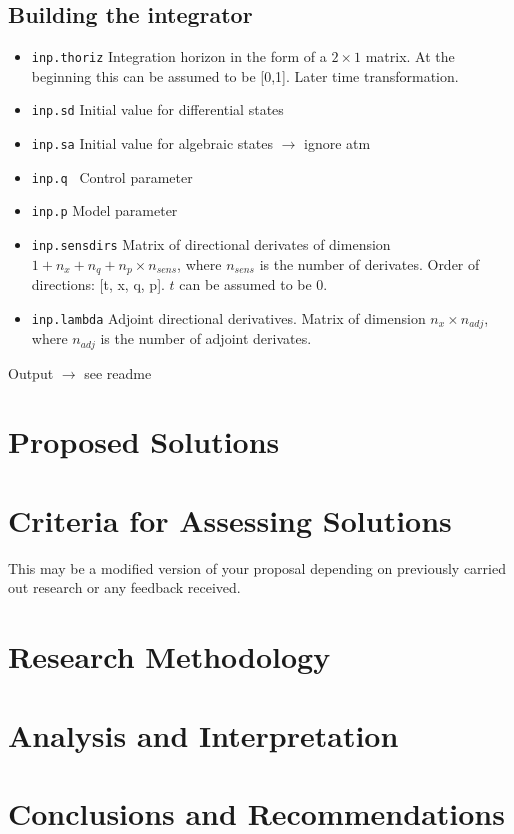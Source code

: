 \documentclass[12pt, letterpaper]{article}
\begin{document}
\subsection{Building the integrator}

\begin{itemize}
    \item \texttt{inp.thoriz} Integration horizon in the form of a $2 \times 1$ matrix. At the beginning  this can be assumed to be [0,1]. Later time transformation.
    \item \texttt{inp.sd} Initial value for differential states 
    \item \texttt{inp.sa} Initial value for algebraic states $\rightarrow$ ignore atm
    \item \texttt{inp.q } Control parameter
    \item \texttt{inp.p} Model parameter
    \item \texttt{inp.sensdirs} Matrix of directional derivates of dimension $1+n_x+n_q+n_p \times n_{sens}$, where $n_{sens}$ is the number of derivates.
         Order of directions: [t, x, q, p]. $t$ can be assumed to be 0.
    \item \texttt{inp.lambda} Adjoint directional derivatives. 
           Matrix of dimension $n_x \times n_{adj}$, where $n_{adj}$ is the number of adjoint derivates.
\end{itemize}


Output $\rightarrow$ see readme




\section{Proposed Solutions}
\section{Criteria for Assessing Solutions} \label{sec:criteria}
This may be a modified version of your proposal depending on previously carried out research or any feedback received.  



\section{Research Methodology}

\section{Analysis and Interpretation}

\section{Conclusions and Recommendations}








\end{document}
